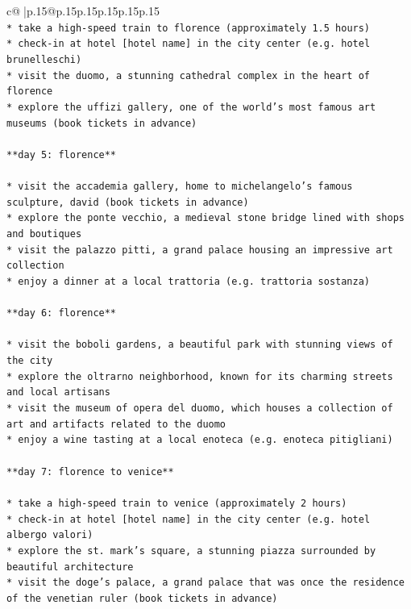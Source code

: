 \documentclass{article}
\begin{document}
{\begin{supertabular}{c@{$\;$}|p{.15\linewidth}@{}p{.15\linewidth}p{.15\linewidth}p{.15\linewidth}p{.15\linewidth}p{.15\linewidth}}
{{{\\ 
\texttt{* take a high{-}speed train to florence (approximately 1.5 hours)} \\
\texttt{* check{-}in at hotel {[}hotel name{]} in the city center (e.g. hotel brunelleschi)} \\
\texttt{* visit the duomo, a stunning cathedral complex in the heart of florence} \\
\texttt{* explore the uffizi gallery, one of the world's most famous art museums (book tickets in advance)} \\
\\ 
\texttt{**day 5: florence**} \\
\\ 
\texttt{* visit the accademia gallery, home to michelangelo's famous sculpture, david (book tickets in advance)} \\
\texttt{* explore the ponte vecchio, a medieval stone bridge lined with shops and boutiques} \\
\texttt{* visit the palazzo pitti, a grand palace housing an impressive art collection} \\
\texttt{* enjoy a dinner at a local trattoria (e.g. trattoria sostanza)} \\
\\ 
\texttt{**day 6: florence**} \\
\\ 
\texttt{* visit the boboli gardens, a beautiful park with stunning views of the city} \\
\texttt{* explore the oltrarno neighborhood, known for its charming streets and local artisans} \\
\texttt{* visit the museum of opera del duomo, which houses a collection of art and artifacts related to the duomo} \\
\texttt{* enjoy a wine tasting at a local enoteca (e.g. enoteca pitigliani)} \\
\\ 
\texttt{**day 7: florence to venice**} \\
\\ 
\texttt{* take a high{-}speed train to venice (approximately 2 hours)} \\
\texttt{* check{-}in at hotel {[}hotel name{]} in the city center (e.g. hotel albergo valori)} \\
\texttt{* explore the st. mark's square, a stunning piazza surrounded by beautiful architecture} \\
\texttt{* visit the doge's palace, a grand palace that was once the residence of the venetian ruler (book tickets in advance)} \\
}}}
\end{supertabular}}
\end{document}
